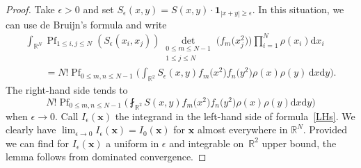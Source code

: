 \documentclass[10pt,a4paper]{amsart}
\numberwithin{equation}{section}
\newcommand{\dd}{\mathrm{d}}
\begin{document}
\begin{proof} Take $\epsilon > 0$ and set $S_{\epsilon}(x,y) = S(x,y) \cdot \mathbf{1}_{|x + y| \geq \epsilon}$. In this situation, we can use de Bruijn's formula and write
\begin{gather}
\nonumber \int_{\mathbb{R}^N} \operatorname{Pf}_{1 \leq i,j \leq N} (S_{\epsilon}(x_i,x_j)) \mathop{\det}_{\substack{0 \leq m \leq N - 1 \\ 1 \leq j \leq N}} \bigl(f_m\bigl(x_j^2\bigr)\bigr) \prod_{i = 1}^N \rho(x_i)\dd x_i \\
\qquad {} = N!\operatorname{Pf}_{0 \leq m,n \leq N - 1} \biggl(\int_{\mathbb{R}^2} S_{\epsilon}(x,y)f_m\bigl(x^2\bigr)f_n\bigl(y^2\bigr)\rho(x)\rho(y)\,\dd x \dd y\biggr).\label{LHs}
\end{gather}
The right-hand side tends to
\[
N! \operatorname{Pf}_{0 \leq m,n \leq N - 1} \biggl(\fint_{\mathbb{R}^2} S(x,y) f_m\bigl(x^2\bigr)f_n\bigl(y^2\bigr)\rho(x)\rho(y)\dd x \dd y\biggr)
\]
 when ${\epsilon \rightarrow 0}$. Call $I_{\epsilon}(\mathbf{x})$ the integrand in the left-hand side of formula~\eqref{LHs}. We clearly have $\lim_{\epsilon \rightarrow 0} I_{\epsilon}(\mathbf{x}) = I_0(\mathbf{x})$ for $\mathbf{x}$ almost everywhere in $\mathbb{R}^N$. Provided we can find for $I_{\epsilon}(\mathbf{x})$ a uniform in $\epsilon$ and integrable on~$\mathbb{R}^2$ upper bound, the lemma follows from dominated convergence.


\end{proof}
\end{document}
